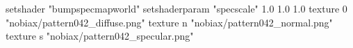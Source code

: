 setshader "bumpspecmapworld"
setshaderparam "specscale" 1.0 1.0 1.0
    texture 0 "nobiax/pattern042_diffuse.png"
    texture n "nobiax/pattern042_normal.png"
    texture s "nobiax/pattern042_specular.png"
